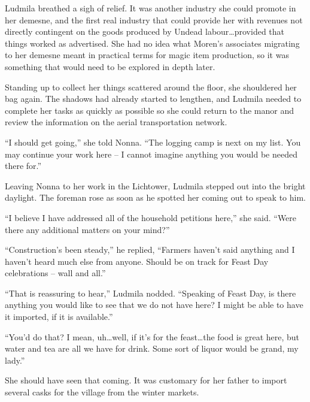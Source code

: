  

Ludmila breathed a sigh of relief. It was another industry she could promote in her demesne, and the first real industry that could provide her with revenues not directly contingent on the goods produced by Undead labour…provided that things worked as advertised. She had no idea what Moren’s associates migrating to her demesne meant in practical terms for magic item production, so it was something that would need to be explored in depth later.

 

Standing up to collect her things scattered around the floor, she shouldered her bag again. The shadows had already started to lengthen, and Ludmila needed to complete her tasks as quickly as possible so she could return to the manor and review the information on the aerial transportation network.

 

“I should get going,” she told Nonna. “The logging camp is next on my list. You may continue your work here – I cannot imagine anything you would be needed there for.”

 

Leaving Nonna to her work in the Lichtower, Ludmila stepped out into the bright daylight. The foreman rose as soon as he spotted her coming out to speak to him.

 

“I believe I have addressed all of the household petitions here,” she said. “Were there any additional matters on your mind?”

 

“Construction’s been steady,” he replied, “Farmers haven’t said anything and I haven’t heard much else from anyone. Should be on track for Feast Day celebrations – wall and all.”

 

“That is reassuring to hear,” Ludmila nodded. “Speaking of Feast Day, is there anything you would like to see that we do not have here? I might be able to have it imported, if it is available.”

 

“You’d do that? I mean, uh…well, if it’s for the feast…the food is great here, but water and tea are all we have for drink. Some sort of liquor would be grand, my lady.”

 

She should have seen that coming. It was customary for her father to import several casks for the village from the winter markets.

